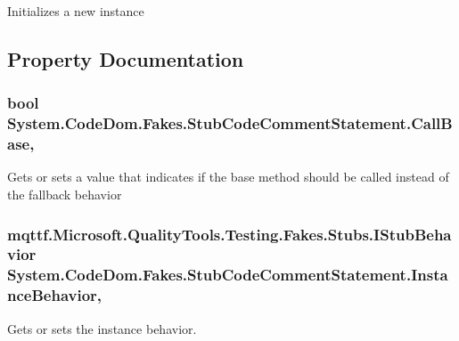 Initializes a new instance



\subsection{Property Documentation}
\hypertarget{class_system_1_1_code_dom_1_1_fakes_1_1_stub_code_comment_statement_a7391ee85ca06c2cdab1a847ccf42c270}{
\subsubsection[{Call\-Base}]{\setlength{\rightskip}{0pt plus 5cm}bool System.\-Code\-Dom.\-Fakes.\-Stub\-Code\-Comment\-Statement.\-Call\-Base\hspace{0.3cm}{\ttfamily [get]}, {\ttfamily [set]}}}\label{class_system_1_1_code_dom_1_1_fakes_1_1_stub_code_comment_statement_a7391ee85ca06c2cdab1a847ccf42c270}


Gets or sets a value that indicates if the base method should be called instead of the fallback behavior

\hypertarget{class_system_1_1_code_dom_1_1_fakes_1_1_stub_code_comment_statement_afc5779cea7da7aacd3ccb84a1b7ba85d}{
\subsubsection[{Instance\-Behavior}]{\setlength{\rightskip}{0pt plus 5cm}mqttf.\-Microsoft.\-Quality\-Tools.\-Testing.\-Fakes.\-Stubs.\-I\-Stub\-Behavior System.\-Code\-Dom.\-Fakes.\-Stub\-Code\-Comment\-Statement.\-Instance\-Behavior\hspace{0.3cm}{\ttfamily [get]}, {\ttfamily [set]}}}\label{class_system_1_1_code_dom_1_1_fakes_1_1_stub_code_comment_statement_afc5779cea7da7aacd3ccb84a1b7ba85d}


Gets or sets the instance behavior.


